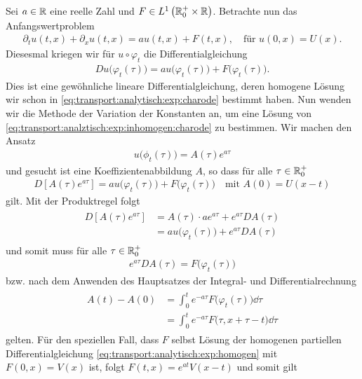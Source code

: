 Sei $a \in \mathbb R$ eine reelle Zahl und $F \in L^1\left( \mathbb R^+_0 \times \mathbb R \right)$.
Betrachte nun das Anfangswertproblem
\begin{align}\label{eq:transport:analytisch:exp:inhomogen}
\partial_t u(t,x) + \partial_x u(t,x) = a u(t,x) + F(t,x), \quad \text{für $u(0,x) = U(x)$.}
\end{align}
Diesesmal kriegen wir für $u \circ \varphi_t$ die Differentialgleichung
\begin{align}\label{eq:transport:analztisch:exp:inhomogen:charode}
Du\bigl( \varphi_t(\tau) \bigr) = a u\bigl( \varphi_t(\tau) \bigr) + F\bigl( \varphi_t(\tau) \bigr).
\end{align}
Dies ist eine gewöhnliche lineare Differentialgleichung, deren homogene Lösung wir schon in \eqref{eq:transport:analytisch:exp:charode} bestimmt haben.
Nun wenden wir die Methode der Variation der Konstanten an, um eine Lösung von \eqref{eq:transport:analztisch:exp:inhomogen:charode} zu bestimmen.
Wir machen den Ansatz 
\begin{align}
u\bigl(\phi_t(\tau)\bigr) = A(\tau) e^{a \tau}
\end{align}
und gesucht ist eine Koeffizientenabbildung $A$, so dass für alle $\tau \in \mathbb R^+_0$
\begin{align}
D \left[ A(\tau) e^{a\tau} \right] = a u\bigl( \varphi_t(\tau) \bigr) + F\bigl( \varphi_t(\tau) \bigr) \quad \text{mit $A(0) = U(x-t)$}
\end{align}
gilt. Mit der Produktregel folgt
\begin{align}
\begin{split}
D \left[ A(\tau) e^{a\tau} \right] &= A(\tau) \cdot a e^{a \tau} + e^{a \tau} DA(\tau)\\
&= a u\bigl( \varphi_t(\tau) \bigr) + e^{a \tau} DA(\tau)
\end{split}
\end{align}
und somit muss für alle $\tau \in \mathbb R^+_0$
\begin{align}
e^{a \tau} DA(\tau) = F\bigl( \varphi_t(\tau) \bigr)
\end{align}
bzw. nach dem Anwenden des Hauptsatzes der Integral- und Differentialrechnung
\begin{align}
\begin{split}
A(t) - A(0) &= \int_0^t e^{-a \tau} F\bigl( \varphi_t(\tau) \bigr) \dd \tau\\
&= \int_0^t e^{-a \tau} F\bigl( \tau, x + \tau - t \bigr) \dd \tau
\end{split}
\end{align}
gelten. Für den speziellen Fall, dass $F$ selbst Lösung der homogenen partiellen Differentialgleichung \eqref{eq:transport:analytisch:exp:homogen} mit $F(0,x) = V(x)$ ist, folgt $F(t,x) = e^{at} V(x - t)$ und somit gilt
